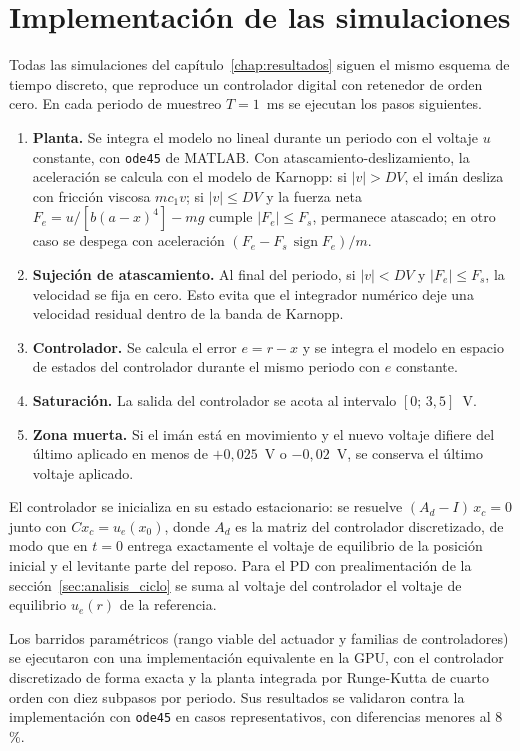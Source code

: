 \chapter{Implementación de las simulaciones}\label{ap:simulacion}

Todas las simulaciones del capítulo~\ref{chap:resultados} siguen el mismo esquema de tiempo discreto, que reproduce un controlador digital con retenedor de orden cero. En cada periodo de muestreo $T=1$~ms se ejecutan los pasos siguientes.

\begin{enumerate}
  \item \textbf{Planta.} Se integra el modelo no lineal durante un periodo con el voltaje $u$ constante, con \texttt{ode45} de MATLAB. Con atascamiento-deslizamiento, la aceleración se calcula con el modelo de Karnopp: si $|v|>DV$, el imán desliza con fricción viscosa $m c_1 v$; si $|v|\le DV$ y la fuerza neta $F_e=u/[b(a-x)^4]-mg$ cumple $|F_e|\le F_s$, permanece atascado; en otro caso se despega con aceleración $(F_e - F_s\,\operatorname{sign}F_e)/m$.
  \item \textbf{Sujeción de atascamiento.} Al final del periodo, si $|v|<DV$ y $|F_e|\le F_s$, la velocidad se fija en cero. Esto evita que el integrador numérico deje una velocidad residual dentro de la banda de Karnopp.
  \item \textbf{Controlador.} Se calcula el error $e=r-x$ y se integra el modelo en espacio de estados del controlador durante el mismo periodo con $e$ constante.
  \item \textbf{Saturación.} La salida del controlador se acota al intervalo $[0;\,3{,}5]$~V.
  \item \textbf{Zona muerta.} Si el imán está en movimiento y el nuevo voltaje difiere del último aplicado en menos de $+0{,}025$~V o $-0{,}02$~V, se conserva el último voltaje aplicado.
\end{enumerate}

El controlador se inicializa en su estado estacionario: se resuelve $(A_d - I)\,x_c = 0$ junto con $C x_c = u_e(x_0)$, donde $A_d$ es la matriz del controlador discretizado, de modo que en $t=0$ entrega exactamente el voltaje de equilibrio de la posición inicial y el levitante parte del reposo. Para el PD con prealimentación de la sección~\ref{sec:analisis_ciclo} se suma al voltaje del controlador el voltaje de equilibrio $u_e(r)$ de la referencia.

Los barridos paramétricos (rango viable del actuador y familias de controladores) se ejecutaron con una implementación equivalente en la GPU, con el controlador discretizado de forma exacta y la planta integrada por Runge-Kutta de cuarto orden con diez subpasos por periodo. Sus resultados se validaron contra la implementación con \texttt{ode45} en casos representativos, con diferencias menores al 8\,\%.


